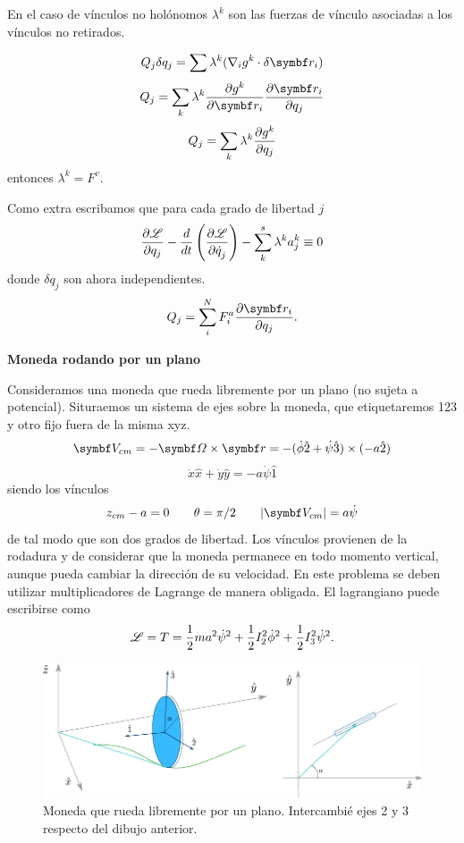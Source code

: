 \documentclass[10pt,oneside]{CBFT_book}
\begin{document}
En el caso de vínculos no holónomos $\lambda^k$ son las fuerzas de vínculo asociadas a los 
vínculos no retirados.

\[
	Q_j {\delta q_j} =  \sum \lambda^k (\nabla_i g^k\cdot\delta\vb{r}_i)
\]
\[
	Q_j =  \sum_k \lambda^k \dpar{g^k}{\vb{r}_i} \dpar{\vb{r}_i}{q_j}
\]
\[
	Q_j =  \sum_k \lambda^k \frac{\partial^{\hspace{-0.05em}} {g^k}}{\partial {q_j}^{\hspace{-0.05em}}}
\]
entonces $\lambda^k=F^v$.

Como extra escribamos que para cada grado de libertad $j$ 
\[
	\frac{\partial^{\hspace{-0.05em}} {\mathscr{L}}}{\partial {q_j}^{\hspace{-0.05em}}} - \frac{d}{dt}\left( \frac{\partial^{\hspace{-0.05em}} {\mathscr{L}}}{\partial {\dot{q}_j}^{\hspace{-0.05em}}} \right) - \sum_k^s \lambda^k a_j^k \equiv 0
\]
donde $\delta q_j$ son ahora independientes.
\[
	Q_j = \sum_i^N F_i^a \dpar{\vb{r}_i}{q_j}. 
\]

\begin{ejemplo}{\bf Moneda rodando por un plano}

Consideramos una moneda que rueda libremente por un plano (no sujeta a potencial).
Situraemos un sistema de ejes sobre la moneda, que etiquetaremos 123 y otro fijo fuera
de la misma xyz.
\[
	\vb{V}_{cm} = -\vb{\Omega} \times \vb{r} =
	-(\dot{\phi}\hat{2} + \dot{\psi}\hat{3}) \times (-a\hat{2})
\]
\[
	\dot{x}\hat{x} + \dot{y}\hat{y} = -a \dot{\psi}\hat{1}
\]
siendo los vínculos
\[
	z_{cm} - a = 0 \qquad \theta=\pi/2 \qquad |\vb{V}_{cm}| = a\dot{\psi}
\]
de tal modo que son dos grados de libertad. Los vínculos provienen de la rodadura y de considerar que la moneda 
permanece en todo momento vertical, aunque pueda cambiar la dirección de su velocidad. En este problema se deben 
utilizar multiplicadores de Lagrange de manera obligada.
El lagrangiano puede escribirse como 
\[
	\mathscr{L} = T = \frac{1}{2}m a^2 \dot{\psi}^2  + \frac{1}{2} I_2^2 \dot{\phi}^2 + \frac{1}{2} I_3^2\dot{\psi}^2.
\]

\begin{figure}
	\begin{center}
	\includegraphics[width=1.0\textwidth]{images/fig_moneda.pdf}	 
	\end{center}
	\caption{Moneda que rueda libremente por un plano. Intercambié ejes 2 y 3 respecto del dibujo anterior.}
\end{figure} 


\end{ejemplo}
\end{document}
